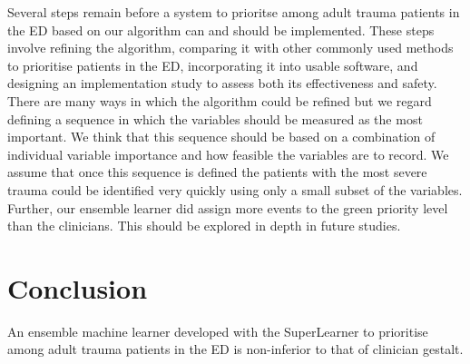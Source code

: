 \documentclass[10pt,letterpaper]{article}\usepackage[]{graphicx}\usepackage[]{color}
\begin{document}
Several steps remain before a system to prioritse among adult trauma patients in
the ED based on our algorithm can and should be implemented. These steps involve
refining the algorithm, comparing it with other commonly used methods to
prioritise patients in the ED, incorporating it into usable software, and
designing an implementation study to assess both its effectiveness and
safety. There are many ways in which the algorithm could be refined but we
regard defining a sequence in which the variables should be measured as the most
important. We think that this sequence should be based on a combination of
individual variable importance and how feasible the variables are to record. We
assume that once this sequence is defined the patients with the most severe
trauma could be identified very quickly using only a small subset of the
variables. Further, our ensemble learner did assign more events to the green
priority level than the clinicians. This should be explored in depth in future
studies.


\section*{Conclusion}
An ensemble machine learner developed with the SuperLearner to prioritise among
adult trauma patients in the ED is non-inferior to that of clinician gestalt.

\end{document}

